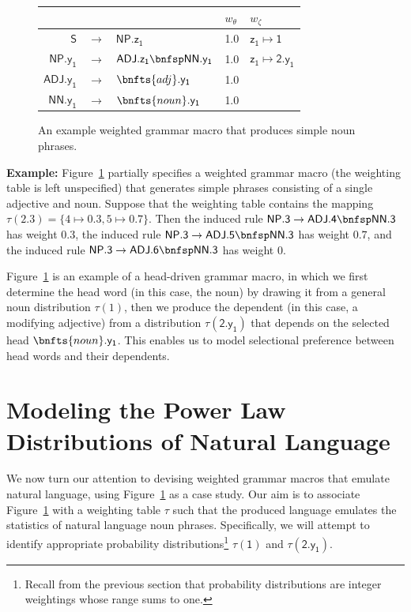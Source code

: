 \documentclass[11pt]{article}
\renewcommand{\bnfpn}[1]{\mathsf{#1}}
\renewcommand{\bnfpo}{\rightarrow}
\begin{document}
\begin{figure}
\begin{tabular}{rcl|l|l} 
&&&$w_\theta$&$w_\zeta$\\
\hline \hline
$\bnfpn{S}$ &$\bnfpo$& $\bnfpn{NP.z_1}$ & 1.0 & $\bnfpn{z_1} \mapsto \bnfpn{1}$ \\
$\bnfpn{NP.y_1}$ &$\bnfpo$& $\bnfpn{ADJ.z_1} \bnfsp \bnfpn{NN.y_1}$ & 1.0 & $\bnfpn{z_1} \mapsto \bnfpn{2.y_1}$\\
$\bnfpn{ADJ.y_1}$ &$\bnfpo$& $\bnfts{adj}.\bnfpn{y_1}$ & 1.0 &\\
$\bnfpn{NN.y_1}$ &$\bnfpo$& $\bnfts{noun}.\bnfpn{y_1}$ & 1.0 &
\end{tabular}
\caption{An example weighted grammar macro that produces simple noun phrases.\label{fig:gmacro2}}
\end{figure}


\textbf{Example: } Figure~\ref{fig:gmacro2} partially specifies a weighted grammar macro (the weighting table is left unspecified) that generates simple phrases consisting of a single adjective and noun. Suppose that the weighting table contains the mapping $\tau(\bnfpn{2.3}) = \{4 \mapsto 0.3, 5 \mapsto 0.7\}$. Then the induced rule $\bnfpn{NP.3} \bnfpo \bnfpn{ADJ.4} \bnfsp \bnfpn{NN.3}$ has weight $0.3$, the induced rule $\bnfpn{NP.3} \bnfpo \bnfpn{ADJ.5} \bnfsp \bnfpn{NN.3}$ has weight $0.7$, and the induced rule $\bnfpn{NP.3} \bnfpo \bnfpn{ADJ.6} \bnfsp \bnfpn{NN.3}$ has weight 0.

Figure~\ref{fig:gmacro2} is an example of a head-driven grammar macro, in which we first determine the head word (in this case, the noun) by drawing it from a general noun distribution $\tau(1)$, then we produce the dependent (in this case, a modifying adjective) from a distribution $\tau(\bnfpn{2.y_1})$ that depends on the selected head $\bnfts{noun}.\bnfpn{y_1}$. This enables us to model selectional preference between head words and their dependents.


\section{Modeling the Power Law Distributions of Natural Language}


We now turn our attention to devising weighted grammar macros that emulate natural language, using Figure~\ref{fig:gmacro2} as a case study. Our aim is to associate Figure~\ref{fig:gmacro2} with a weighting table $\tau$ such that the produced language emulates the statistics of natural language noun phrases. Specifically, we will attempt to identify appropriate probability distributions\footnote{Recall from the previous section that probability distributions are integer weightings whose range sums to one.} $\tau(\bnfpn{1})$ and $\tau(\bnfpn{2.y_1})$. 
\end{document}
